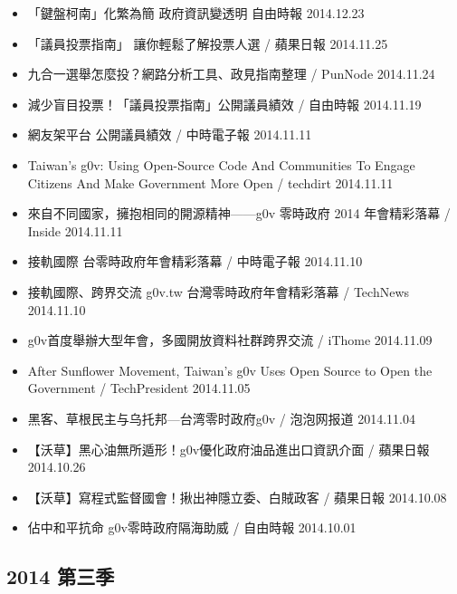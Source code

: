\begin{itemize}
\item 「鍵盤柯南」化繁為簡 政府資訊變透明 自由時報 2014.12.23
\item 「議員投票指南」 讓你輕鬆了解投票人選 / 蘋果日報 2014.11.25
\item 九合一選舉怎麼投？網路分析工具、政見指南整理 / PunNode 2014.11.24
\item 減少盲目投票！「議員投票指南」公開議員績效 / 自由時報 2014.11.19
\item 網友架平台 公開議員績效 / 中時電子報 2014.11.11
\item Taiwan's g0v: Using Open-Source Code And Communities To Engage Citizens And Make Government More Open / techdirt 2014.11.11
\item 來自不同國家，擁抱相同的開源精神——g0v 零時政府 2014 年會精彩落幕 / Inside 2014.11.11
\item 接軌國際 台零時政府年會精彩落幕 / 中時電子報 2014.11.10
\item 接軌國際、跨界交流 g0v.tw 台灣零時政府年會精彩落幕 / TechNews 2014.11.10
\item g0v首度舉辦大型年會，多國開放資料社群跨界交流 / iThome 2014.11.09
\item After Sunflower Movement, Taiwan's g0v Uses Open Source to Open the Government / TechPresident 2014.11.05
\item 黑客、草根民主与乌托邦—台湾零时政府g0v / 泡泡网报道 2014.11.04
\item 【沃草】黑心油無所遁形！g0v優化政府油品進出口資訊介面 / 蘋果日報 2014.10.26
\item 【沃草】寫程式監督國會！揪出神隱立委、白賊政客 / 蘋果日報 2014.10.08
\item 佔中和平抗命 g0v零時政府隔海助威 / 自由時報 2014.10.01

\end{itemize}

\subsection{2014 第三季}

